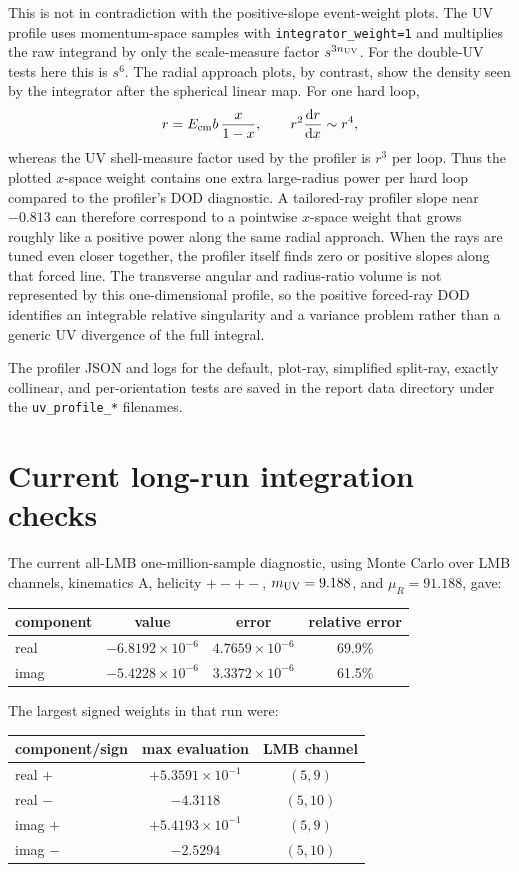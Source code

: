 \documentclass[11pt]{article}
\newcommand{\dd}{\mathrm{d}}
\begin{document}
This is not in contradiction with the positive-slope event-weight plots.  The
UV profile uses momentum-space samples with \texttt{integrator\_weight=1} and
multiplies the raw integrand by only the scale-measure factor
$s^{3n_{\rm UV}}$.  For the double-UV tests here this is $s^6$.  The radial
approach plots, by contrast, show the density seen by the integrator after the
spherical linear map.  For one hard loop,
\[
  r = E_{\rm cm} b\,\frac{x}{1-x},
  \qquad
  r^2\frac{\dd r}{\dd x}\sim r^4 ,
\]
whereas the UV shell-measure factor used by the profiler is $r^3$ per loop.
Thus the plotted $x$-space weight contains one extra large-radius power per
hard loop compared to the profiler's DOD diagnostic.  A tailored-ray profiler
slope near $-0.813$ can therefore correspond to a pointwise $x$-space weight
that grows roughly like a positive power along the same radial approach.  When
the rays are tuned even closer together, the profiler itself finds zero or
positive slopes along that forced line.  The transverse angular and
radius-ratio volume is not represented by this one-dimensional profile, so the
positive forced-ray DOD identifies an integrable relative singularity and a
variance problem rather than a generic UV divergence of the full integral.

The profiler JSON and logs for the default, plot-ray, simplified split-ray,
exactly collinear, and per-orientation tests are saved in the report data
directory under the \texttt{uv\_profile\_*} filenames.

\section{Current long-run integration checks}

The current all-LMB one-million-sample diagnostic, using Monte Carlo over LMB
channels, kinematics A, helicity $+-+-$, $m_{\rm UV}=9.188$, and
$\mu_R=91.188$, gave:
\begin{center}
\begin{tabular}{lccc}
\toprule
component & value & error & relative error\\
\midrule
real & $-6.8192\times 10^{-6}$ & $4.7659\times 10^{-6}$ & 69.9\%\\
imag & $-5.4228\times 10^{-6}$ & $3.3372\times 10^{-6}$ & 61.5\%\\
\bottomrule
\end{tabular}
\end{center}
The largest signed weights in that run were:
\begin{center}
\begin{tabular}{lcc}
\toprule
component/sign & max evaluation & LMB channel\\
\midrule
real $+$ & $+5.3591\times 10^{-1}$ & $(5,9)$\\
real $-$ & $-4.3118$ & $(5,10)$\\
imag $+$ & $+5.4193\times 10^{-1}$ & $(5,9)$\\
imag $-$ & $-2.5294$ & $(5,10)$\\
\bottomrule
\end{tabular}
\end{center}
\end{document}
